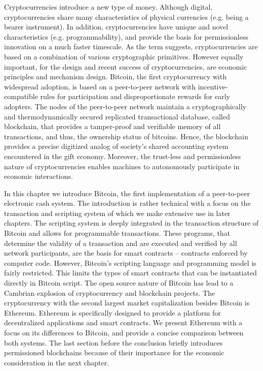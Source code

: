 Cryptocurrencies introduce a new type of money. Although digital, cryptocurrencies share many characteristics of physical currencies (e.g. being a bearer instrument). In addition, cryptocurrencies have unique and novel characteristics (e.g. programmability), and provide the basis for permissionless innovation on a much faster timescale. As the term suggests, cryptocurrencies are based on a combination of various cryptographic primitives. However equally important, for the design and recent success of cryptocurrencies, are economic principles and mechanism design. Bitcoin, the first cryptocurrency with widespread adoption, is based on a peer-to-peer network with incentive-compatible rules for participation and disproportionate rewards for early adopters. The nodes of the peer-to-peer network maintain a cryptographically and thermodynamically secured replicated transactional database, called blockchain, that provides a tamper-proof and verifiable memory of all transactions, and thus, the ownership status of bitcoins. Hence, the blockchain provides a precise digitized analog of society's shared accounting system encountered in the gift economy. Moreover, the trust-less and permissionless nature of cryptocurrencies enables machines to autonomously participate in economic interactions.

In this chapter we introduce Bitcoin, the first implementation of a peer-to-peer electronic cash system. The introduction is rather technical with a focus on the transaction and scripting system of which we make extensive use in later chapters. The scripting system is deeply integrated in the transaction structure of Bitcoin and allows for programmable transactions. These programs, that determine the validity of a transaction and are executed and verified by all network participants, are the basis for smart contracts -- contracts enforced by computer code. However, Bitcoin's scripting language and programming model is fairly restricted. This limits the types of smart contracts that can be instantiated directly in Bitcoin script. 
The open source nature of Bitcoin has lead to a Cambrian explosion of cryptocurrency and blockchain projects. The cryptocurrency with the second largest market capitalization besides Bitcoin is Ethereum. Ethereum is specifically designed to provide a platform for decentralized applications and smart contracts. We present Ethereum with a focus on its differences to Bitcoin, and provide a concise comparison between both systems. The last section before the conclusion briefly introduces permissioned blockchains because of their importance for the economic consideration in the next chapter.



